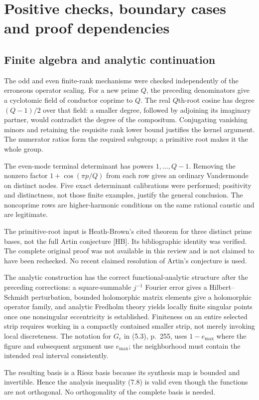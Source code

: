 \documentclass[10pt]{article}
\begin{document}
\section*{Positive checks, boundary cases and proof dependencies}
\subsection*{Finite algebra and analytic continuation}
The odd and even finite-rank mechanisms were checked independently of the erroneous operator scaling. For a new prime \(Q\), the preceding denominators give a cyclotomic field of conductor coprime to \(Q\). The real \(Q\)th-root cosine has degree \((Q-1)/2\) over that field: a smaller degree, followed by adjoining its imaginary partner, would contradict the degree of the compositum. Conjugating vanishing minors and retaining the requisite rank lower bound justifies the kernel argument. The numerator ratios form the required subgroup; a primitive root makes it the whole group.\par
The even-mode terminal determinant has powers \(1,\ldots,Q-1\). Removing the nonzero factor \(1+\cos(\pi p/Q)\) from each row gives an ordinary Vandermonde on distinct nodes. Five exact determinant calibrations were performed; positivity and distinctness, not those finite examples, justify the general conclusion. The noncoprime rows are higher-harmonic conditions on the same rational caustic and are legitimate.\par
The primitive-root input is Heath-Brown’s cited theorem for three distinct prime bases, not the full Artin conjecture [HB]. Its bibliographic identity was verified. The complete original proof was not available in this review and is not claimed to have been rechecked. No recent claimed resolution of Artin’s conjecture is used.\par
The analytic construction has the correct functional-analytic structure after the preceding corrections: a square-summable \(j^{-1}\) Fourier error gives a Hilbert–Schmidt perturbation, bounded holomorphic matrix elements give a holomorphic operator family, and analytic Fredholm theory yields locally finite singular points once one nonsingular eccentricity is established. Finiteness on an entire selected strip requires working in a compactly contained smaller strip, not merely invoking local discreteness. The notation for \(G_e\) in (5.3), p. 255, uses \(1-e_{\max}\) where the figure and subsequent argument use \(e_{\max}\); the neighborhood must contain the intended real interval consistently.\par
The resulting basis is a Riesz basis because its synthesis map is bounded and invertible. Hence the analysis inequality (7.8) is valid even though the functions are not orthogonal. No orthogonality of the complete basis is needed.\par
\end{document}
